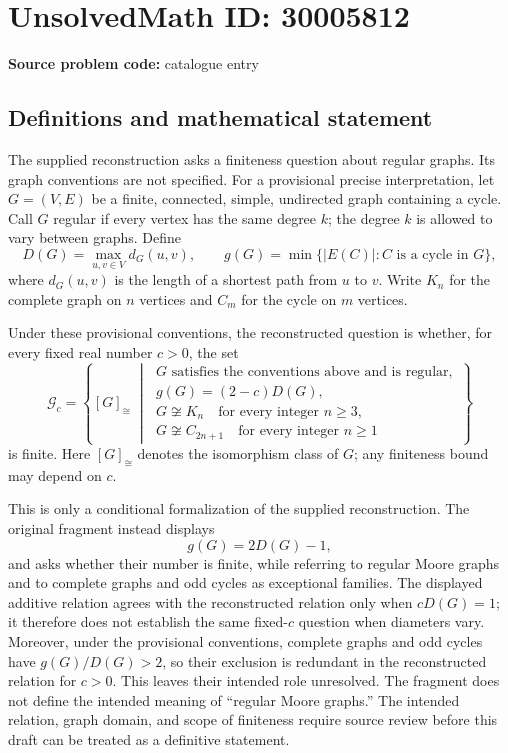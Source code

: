 \documentclass[11pt]{article}
\begin{document}
\section*{UnsolvedMath ID: 30005812}
\textbf{Source problem code:} catalogue entry
\subsection{Definitions and mathematical statement}
The supplied reconstruction asks a finiteness question about regular graphs. Its graph conventions are not specified. For a provisional precise interpretation, let \(G=(V,E)\) be a finite, connected, simple, undirected graph containing a cycle. Call \(G\) regular if every vertex has the same degree \(k\); the degree \(k\) is allowed to vary between graphs. Define
\[
D(G)=\max_{u,v\in V}d_G(u,v),\qquad
g(G)=\min\{\lvert E(C)\rvert:C\text{ is a cycle in }G\},
\]
where \(d_G(u,v)\) is the length of a shortest path from \(u\) to \(v\). Write \(K_n\) for the complete graph on \(n\) vertices and \(C_m\) for the cycle on \(m\) vertices.

Under these provisional conventions, the reconstructed question is whether, for every fixed real number \(c>0\), the set
\[
\mathcal G_c=
\left\{
[G]_{\cong}\;\middle|\;
\begin{gathered}
G\text{ satisfies the conventions above and is regular},\\
g(G)=(2-c)D(G),\\
G\not\cong K_n\quad\text{for every integer }n\geq3,\\
G\not\cong C_{2n+1}\quad\text{for every integer }n\geq1
\end{gathered}
\right\}
\]
is finite. Here \([G]_{\cong}\) denotes the isomorphism class of \(G\); any finiteness bound may depend on \(c\).

This is only a conditional formalization of the supplied reconstruction. The original fragment instead displays
\[
g(G)=2D(G)-1,
\]
and asks whether their number is finite, while referring to regular Moore graphs and to complete graphs and odd cycles as exceptional families. The displayed additive relation agrees with the reconstructed relation only when \(cD(G)=1\); it therefore does not establish the same fixed-\(c\) question when diameters vary. Moreover, under the provisional conventions, complete graphs and odd cycles have \(g(G)/D(G)>2\), so their exclusion is redundant in the reconstructed relation for \(c>0\). This leaves their intended role unresolved. The fragment does not define the intended meaning of ``regular Moore graphs.'' The intended relation, graph domain, and scope of finiteness require source review before this draft can be treated as a definitive statement.
\end{document}
